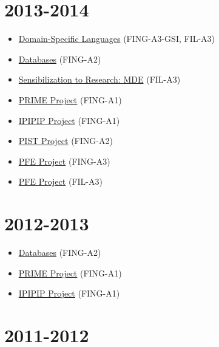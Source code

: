 \hypertarget{section-9}{%
\section{2013-2014}\label{section-9}}

\begin{itemize}
\tightlist
\item
  \href{https://campusneo.mines-nantes.fr/campus/course/view.php?id=1415}{Domain-Specific
  Languages} (FING-A3-GSI, FIL-A3)
\item
  \href{https://campusneo.mines-nantes.fr/campus/course/view.php?id=1327}{Databases}
  (FING-A2)
\item
  \href{https://campusneo.mines-nantes.fr/campus/course/view.php?id=1532}{Sensibilization
  to Research: MDE} (FIL-A3)
\item
  \href{https://campusneo.mines-nantes.fr/campus/course/view.php?id=621}{PRIME
  Project} (FING-A1)
\item
  \href{https://campusneo.mines-nantes.fr/campus/course/view.php?id=391}{IPIPIP
  Project} (FING-A1)
\item
  \href{https://campusneo.mines-nantes.fr/campus/course/view.php?id=115}{PIST
  Project} (FING-A2)
\item
  \href{https://campusneo.mines-nantes.fr/campus/course/view.php?id=1305}{PFE
  Project} (FING-A3)
\item
  \href{https://campusneo.mines-nantes.fr/campus/course/view.php?id=1344}{PFE
  Project} (FIL-A3)
\end{itemize}

\hypertarget{section-10}{%
\section{2012-2013}\label{section-10}}

\begin{itemize}
\tightlist
\item
  \href{https://campusneo.mines-nantes.fr/campus/course/view.php?id=1133}{Databases}
  (FING-A2)
\item
  \href{https://campusneo.mines-nantes.fr/campus/course/view.php?id=621}{PRIME
  Project} (FING-A1)
\item
  \href{https://campusneo.mines-nantes.fr/campus/course/view.php?id=391}{IPIPIP
  Project} (FING-A1)
\end{itemize}

\hypertarget{section-11}{%
\section{2011-2012}\label{section-11}}

